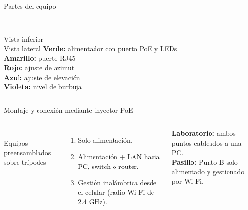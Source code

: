 \begin{frame}{Partes del equipo}
  \begin{columns}[c]
    \centering
    \\
    {\scriptsize Vista inferior}
    \centering
    \\
    {\scriptsize Vista lateral}
    \small
    \textcolor[HTML]{7CB342}{\textbf{Verde:}} alimentador con puerto PoE y LEDs\\[3pt]
    \textcolor[HTML]{F9A825}{\textbf{Amarillo:}} puerto RJ45\\[3pt]
    \textcolor[HTML]{E53935}{\textbf{Rojo:}} ajuste de azimut\\[3pt]
    \textcolor[HTML]{1E88E5}{\textbf{Azul:}} ajuste de elevación\\[3pt]
    \textcolor[HTML]{7E57C2}{\textbf{Violeta:}} nivel de burbuja
  \end{columns}
\end{frame}

\begin{frame}{Montaje y conexión mediante inyector PoE}
  \begin{columns}[c]
    \centering
    \\
    {\scriptsize Equipos preensamblados sobre trípodes}
    \centering
    \small
    \begin{enumerate}
      \item Solo alimentación.
      \item Alimentación + LAN hacia PC, switch o router.
      \item Gestión inalámbrica desde el celular (radio Wi-Fi de 2.4 GHz).
    \end{enumerate}
    \vspace{4pt}
    \textbf{Laboratorio:} ambos puntos cableados a una PC.\\
    \textbf{Pasillo:} Punto B solo alimentado y gestionado por Wi-Fi.
  \end{columns}
\end{frame}
